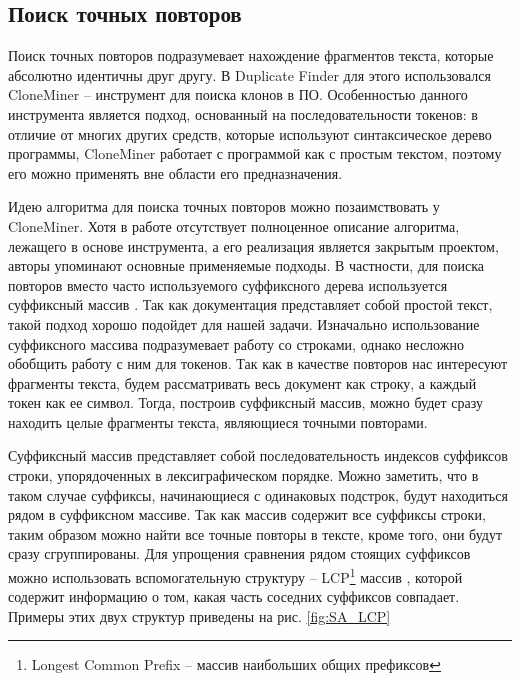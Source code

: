 \documentclass[14pt]{matmex-diploma-custom}
\begin{document}
\subsection{Поиск точных повторов}

Поиск точных повторов подразумевает нахождение фрагментов текста, которые абсолютно идентичны друг другу. В Duplicate Finder для этого использовался CloneMiner\cite{bib:tool:CloneMiner} -- инструмент для поиска клонов в ПО. Особенностью данного инструмента является подход, основанный на последовательности токенов: в отличие от многих других средств, которые используют синтаксическое дерево программы\cite{bib:tool:ASTSearch}, CloneMiner работает с программой как с простым текстом, поэтому его можно применять вне области его предназначения.

Идею алгоритма для поиска точных повторов можно позаимствовать у CloneMiner. Хотя в работе \cite{bib:tool:CloneMiner} отсутствует полноценное описание алгоритма, лежащего в основе инструмента, а его реализация является закрытым проектом, авторы упоминают основные применяемые подходы. В частности, для поиска повторов вместо часто используемого суффиксного дерева \cite{bib:art:SuffixTree} используется суффиксный массив \cite{bib:art:SuffixArray}. Так как документация представляет собой простой текст, такой подход хорошо подойдет для нашей задачи. Изначально использование суффиксного массива подразумевает работу со строками, однако несложно обобщить работу с ним для токенов. Так как в качестве повторов нас интересуют фрагменты текста, будем рассматривать весь документ как строку, а каждый токен как ее символ. Тогда, построив суффиксный массив, можно будет сразу находить целые фрагменты текста, являющиеся точными повторами.

Суффиксный массив представляет собой последовательность индексов суффиксов строки, упорядоченных в лексиграфическом порядке. Можно заметить, что в таком случае суффиксы, начинающиеся с одинаковых подстрок, будут находиться рядом в суффиксном массиве. Так как массив содержит все суффиксы строки, таким образом можно найти все точные повторы в тексте, кроме того, они будут сразу сгруппированы. Для упрощения сравнения рядом стоящих суффиксов можно использовать вспомогательную структуру -- LCP\footnote{Longest Common Prefix -- массив наибольших общих префиксов} массив \cite{bib:art:LCPArray}, которой содержит информацию о том, какая часть соседних суффиксов совпадает. Примеры этих двух структур приведены на рис. \ref{fig:SA_LCP}
\end{document}
